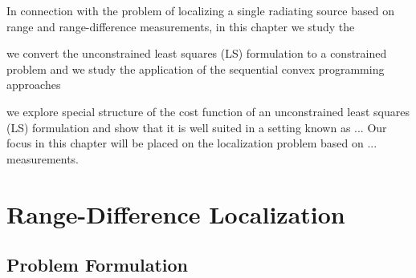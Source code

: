\label{chapter:scp}

%
%
%
%


In connection with the problem of localizing a single radiating source based on range and range-difference measurements, in this chapter
we study the 

we convert the unconstrained least squares (LS) formulation to a constrained problem and 
we study the application of the sequential convex programming approaches


 we explore special structure of the cost function of an unconstrained least squares (LS) formulation and show that it is well suited in a setting known as ... Our focus in this chapter will be placed on the localization problem based on ... measurements.




\section{Range-Difference Localization}
\subsection{Problem Formulation}


